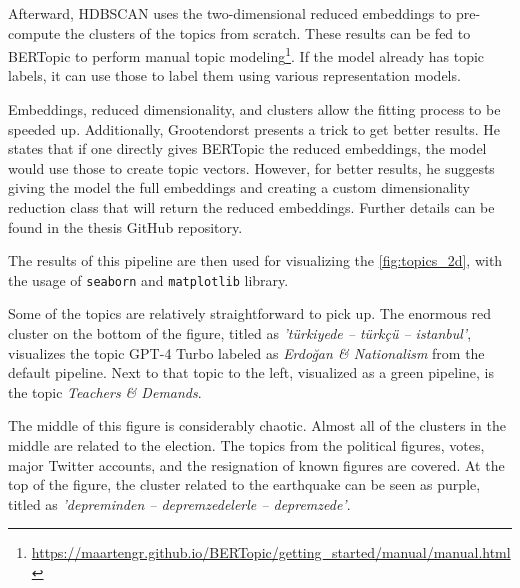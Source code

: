 Afterward, HDBSCAN uses the two-dimensional reduced embeddings to pre-compute the clusters of 
the topics from scratch. These results can be fed to BERTopic to perform manual topic 
modeling\footnote{\url{https://maartengr.github.io/BERTopic/getting_started/manual/manual.html}}.
If the model already has topic labels, it can use those to label them using various 
representation models.

Embeddings, reduced dimensionality, and clusters allow the fitting 
process to be speeded up. Additionally, Grootendorst presents a trick to get better results. 
He states that if one directly gives BERTopic the reduced embeddings, the model would use those 
to create topic vectors. However, for better results, he suggests giving the model 
the full embeddings and creating a custom dimensionality reduction class that will return the 
reduced embeddings. Further details can be found in the thesis GitHub repository.

The results of this pipeline are then used for visualizing the \autoref{fig:topics_2d}, 
with the usage of \texttt{seaborn} and \texttt{matplotlib} library.

Some of the topics are relatively straightforward to pick up. The enormous red cluster on the 
bottom of the figure, titled as \textit{'türkiyede -- türkçü -- istanbul'}, visualizes the 
topic GPT-4 Turbo labeled as \textit{Erdoğan \& Nationalism} from the default pipeline. 
Next to that topic to the left, visualized as a green pipeline, is the topic 
\textit{Teachers \& Demands}. 

The middle of this figure is considerably chaotic. Almost all of the clusters in the middle are 
related to the election. The topics from the political figures, votes, major Twitter accounts, 
and the resignation of known figures are covered. At the top of the figure, the cluster 
related to the earthquake can be seen as purple, titled as 
\textit{'depreminden -- depremzedelerle -- depremzede'}.

